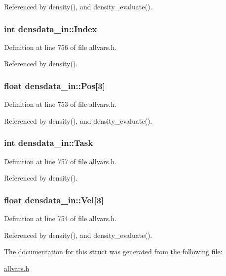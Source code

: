 Referenced by density(), and density\_\-evaluate().

\hypertarget{structdensdata__in_a1c79a4d4fdcc9e483946193f2d030308}{
\subsubsection[{Index}]{\setlength{\rightskip}{0pt plus 5cm}int {\bf densdata\_\-in::Index}}}
\label{structdensdata__in_a1c79a4d4fdcc9e483946193f2d030308}


Definition at line 756 of file allvars.h.



Referenced by density().

\hypertarget{structdensdata__in_a619b6e6d76f91b047119249915527164}{
\subsubsection[{Pos}]{\setlength{\rightskip}{0pt plus 5cm}float {\bf densdata\_\-in::Pos}\mbox{[}3\mbox{]}}}
\label{structdensdata__in_a619b6e6d76f91b047119249915527164}


Definition at line 753 of file allvars.h.



Referenced by density(), and density\_\-evaluate().

\hypertarget{structdensdata__in_a010be125c58096f5cd2fec47f210747b}{
\subsubsection[{Task}]{\setlength{\rightskip}{0pt plus 5cm}int {\bf densdata\_\-in::Task}}}
\label{structdensdata__in_a010be125c58096f5cd2fec47f210747b}


Definition at line 757 of file allvars.h.



Referenced by density().

\hypertarget{structdensdata__in_a8df7f2cfb255b800bbbbb69d674ae4ac}{
\subsubsection[{Vel}]{\setlength{\rightskip}{0pt plus 5cm}float {\bf densdata\_\-in::Vel}\mbox{[}3\mbox{]}}}
\label{structdensdata__in_a8df7f2cfb255b800bbbbb69d674ae4ac}


Definition at line 754 of file allvars.h.



Referenced by density(), and density\_\-evaluate().



The documentation for this struct was generated from the following file:\begin{DoxyCompactItemize}
\item 
\hyperlink{allvars_8h}{allvars.h}\end{DoxyCompactItemize}
